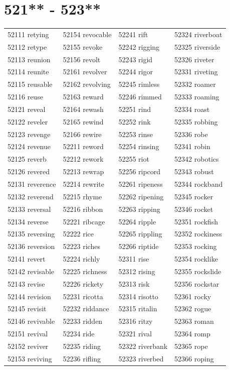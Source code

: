 \documentclass[10pt, oneside]{book}
\begin{document}
\begin{table}
	\centering
	\section*{521** - 523**}
	\begin{tabular}{l l l l}
52111 retying &52154 revocable &52241 rift &52324 riverboat\\
52112 retype &52155 revoke &52242 rigging &52325 riverside\\
52113 reunion &52156 revolt &52243 rigid &52326 riveter\\
52114 reunite &52161 revolver &52244 rigor &52331 riveting\\
52115 reusable &52162 revolving &52245 rimless &52332 roamer\\
52116 reuse &52163 reward &52246 rimmed &52333 roaming\\
52121 reveal &52164 rewash &52251 rind &52334 roast\\
52122 reveler &52165 rewind &52252 rink &52335 robbing\\
52123 revenge &52166 rewire &52253 rinse &52336 robe\\
52124 revenue &52211 reword &52254 rinsing &52341 robin\\
52125 reverb &52212 rework &52255 riot &52342 robotics\\
52126 revered &52213 rewrap &52256 ripcord &52343 robust\\
52131 reverence &52214 rewrite &52261 ripeness &52344 rockband\\
52132 reverend &52215 rhyme &52262 ripening &52345 rocker\\
52133 reversal &52216 ribbon &52263 ripping &52346 rocket\\
52134 reverse &52221 ribcage &52264 ripple &52351 rockfish\\
52135 reversing &52222 rice &52265 rippling &52352 rockiness\\
52136 reversion &52223 riches &52266 riptide &52353 rocking\\
52141 revert &52224 richly &52311 rise &52354 rocklike\\
52142 revisable &52225 richness &52312 rising &52355 rockslide\\
52143 revise &52226 rickety &52313 risk &52356 rockstar\\
52144 revision &52231 ricotta &52314 risotto &52361 rocky\\
52145 revisit &52232 riddance &52315 ritalin &52362 rogue\\
52146 revivable &52233 ridden &52316 ritzy &52363 roman\\
52151 revival &52234 ride &52321 rival &52364 romp\\
52152 reviver &52235 riding &52322 riverbank &52365 rope\\
52153 reviving &52236 rifling &52323 riverbed &52366 roping\\
	\end{tabular}
 \end{table}
\clearpage
\end{document}
